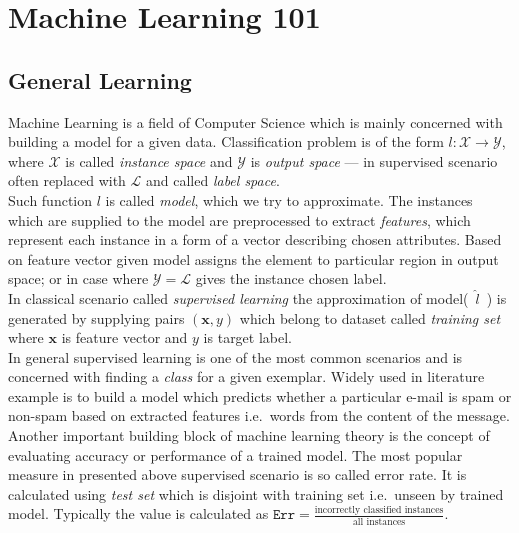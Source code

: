 \documentclass[12pt, a4paper, pdflatex]{report}
\begin{document}
\section{Machine Learning 101}
\subsection{General Learning}
Machine Learning is a field of Computer Science which is mainly concerned with building a model for a given data. Classification problem is of the form $\mathit{l} : \mathscr{X} \rightarrow \mathscr{Y}$, where $\mathscr{X}$ is called \emph{instance space} and $\mathscr{Y}$ is \emph{output space} --- in supervised scenario often replaced with $\mathscr{L}$ and called \emph{label space}.\\
Such function $\mathit{l}$ is called \emph{model}, which we try to approximate. The instances which are supplied to the model are preprocessed to extract \emph{features}, which represent each instance in a form of a vector describing chosen attributes. Based on feature vector given model assigns the element to particular region in output space; or in case where $\mathscr{Y} = \mathscr{L}$ gives the instance chosen label.\\

In classical scenario called \emph{supervised learning} the approximation of model(~$\mathit{\hat{l}}$~) is generated by supplying pairs $(\mathit{\mathbf{x}}, \mathit{y})$ which belong to dataset called \emph{training set} where $\mathit{\mathbf{x}}$ is feature vector and $\mathit{y}$ is target label.\\
In general supervised learning is one of the most common scenarios and is concerned with finding a \emph{class} for a given exemplar. Widely used in literature example is to build a model which predicts whether a particular e-mail is spam or non-spam based on extracted features i.e.\ words from the content of the message.\\

Another important building block of machine learning theory is the concept of evaluating accuracy or performance of a trained model. The most popular measure in presented above supervised scenario is so called error rate. It is calculated using \emph{test set} which is disjoint with training set i.e.\ unseen by trained model. Typically the value is calculated as $\mathtt{Err} = \frac{\text{incorrectly classified instances}}{\text{all instances}}$.\\
\end{document}
